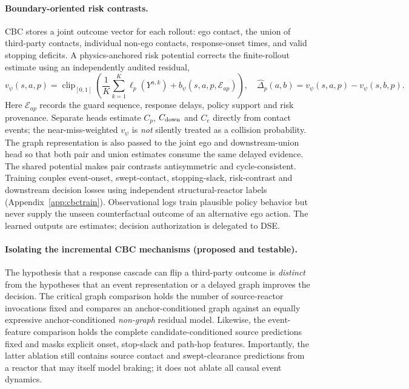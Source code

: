 \documentclass[10pt]{article}
\DeclareMathOperator{\clip}{clip}
\begin{document}
\paragraph{Boundary-oriented risk contrasts.}
CBC stores a joint outcome vector for each rollout: ego contact, the union of third-party contacts, individual non-ego contacts, response-onset times, and valid stopping deficits. A physics-anchored risk potential corrects the finite-rollout estimate using an independently audited residual,
\begin{equation}
 v_\psi(s,a,p)=\clip_{[0,1]}\!\left(
 \frac1K\sum_{k=1}^{K}\ell_p(Y^{a,k})+b_\psi(s,a,p,\mathcal E_{ap})\right),
 \quad\widehat\Delta_p(a,b)=v_\psi(s,a,p)-v_\psi(s,b,p).
 \label{eq:contrast}
\end{equation}
Here $\mathcal E_{ap}$ records the guard sequence, response delays, policy support and risk provenance. Separate heads estimate $C_p$, $C_{\rm down}$ and $C_e$ directly from contact events; the near-miss-weighted $v_\psi$ is \emph{not} silently treated as a collision probability. The graph representation is also passed to the joint ego and downstream-union head so that both pair and union estimates consume the same delayed evidence. The shared potential makes pair contrasts antisymmetric and cycle-consistent. Training couples event-onset, swept-contact, stopping-slack, risk-contrast and downstream decision losses using independent structural-reactor labels (Appendix~\ref{app:cbctrain}). Observational logs train plausible policy behavior but never supply the unseen counterfactual outcome of an alternative ego action. The learned outputs are estimates; decision authorization is delegated to DSE.

\paragraph{Isolating the incremental CBC mechanisms (proposed and testable).}
The hypothesis that a response cascade can flip a third-party outcome is
\emph{distinct} from the hypotheses that an event representation or a delayed
graph improves the decision. The critical graph comparison holds the number of
source-reactor invocations fixed and compares an anchor-conditioned graph
against an equally expressive anchor-conditioned \emph{non-graph} residual
model. Likewise, the event-feature comparison holds the complete
candidate-conditioned source predictions fixed and masks explicit onset,
stop-slack and path-hop features. Importantly, the latter ablation still
contains source contact and swept-clearance predictions from a reactor that
may itself model braking; it does not ablate all causal event dynamics.
\end{document}
